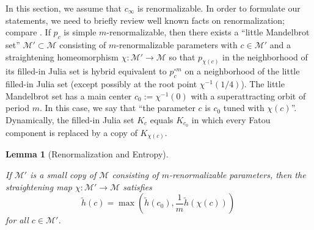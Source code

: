 \documentclass[12pt]{amsart}
\newcommand{\M}{\mathscr M}
\newcommand{\0}{\texttt{0}}
\newcommand{\1}{\texttt{1}}
\newtheorem{lemma}[theorem]{Lemma}
\theoremstyle{definition}
\numberwithin{equation}{section}
\newcommand{\lineclear}{\rule{0pt}{2pt}\newline}
\begin{document}
In this section, we assume that $c_\infty$ is renormalizable. 
In order to formulate our statements, we need to briefly review well known facts on renormalization; compare \cite{Polylike, McMullenRenormalization,MiSelfSim,MiRenorm}. 
If $p_c$ is simple $m$-renormalizable, then there exists a ``little Mandelbrot set'' $\M'\subset\M$ consisting of $m$-renormalizable parameters with $c\in\M'$ and a straightening homeomorphism $\chi\colon\M'\to\M$ so that $p_{\chi(c)}$ in the neighborhood of its filled-in Julia set is hybrid equivalent to $p_c^{\circ m}$ on a neighborhood of the little filled-in Julia set (except possibly at the root point $\chi^{-1}(1/4)$). The little Mandelbrot set has a main center $c_0:=\chi^{-1}(0)$ with a superattracting orbit of period $m$. In this case, we say that ``the parameter $c$ is $c_0$ tuned with $\chi(c)$''. Dynamically, the filled-in Julia set $K_{c}$ equals $K_{c_0}$ in which every Fatou component is replaced by a copy of $K_{\chi(c)}$.  




\begin{lemma}[Renormalization and Entropy]
\label{Lem:Renormalization} \lineclear
If $\M'$ is a small copy of $\M$ consisting of $m$-renormalizable parameters, then the straightening map  $\chi:\M'\to \M$ satisfies
\[
\tilde h(c)=\max\left(\tilde h(c_0),\frac 1 m\tilde h(\chi( c))\right)
\;
\]
for all $c\in \M'$.
\end{lemma}
\end{document}
